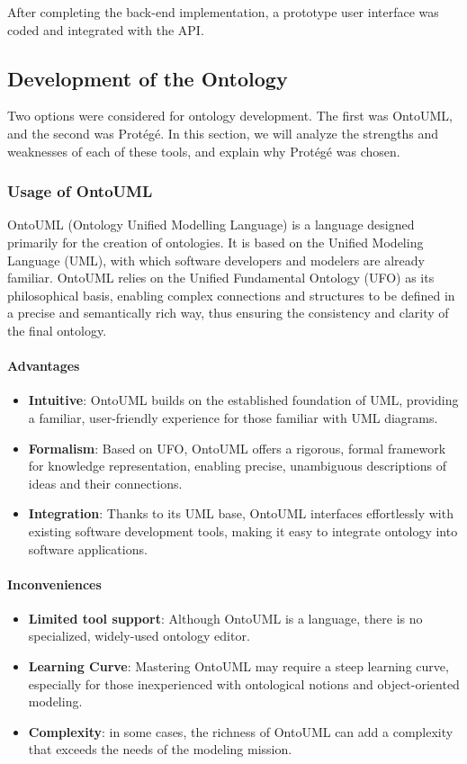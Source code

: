 After completing the back-end implementation, a prototype user interface was coded and integrated with the API.


\subsection{Development of the Ontology \label{subsec:ontologyDev}}
Two options were considered for ontology development. The first was OntoUML, and the second was Protégé. In this section, we will analyze the strengths and weaknesses of each of these tools, and explain why Protégé was chosen.

    \subsubsection{Usage of OntoUML}
    OntoUML (Ontology Unified Modelling Language) is a language designed primarily for the creation of ontologies. It is based on the Unified Modeling Language (UML), with which software developers and modelers are already familiar. OntoUML relies on the Unified Fundamental Ontology (UFO) as its philosophical basis, enabling complex connections and structures to be defined in a precise and semantically rich way, thus ensuring the consistency and clarity of the final ontology.
    
    \paragraph{Advantages}
        \begin{itemize}
            \item \textbf{Intuitive}: OntoUML builds on the established foundation of UML, providing a familiar, user-friendly experience for those familiar with UML diagrams.
            \item \textbf{Formalism}: Based on UFO, OntoUML offers a rigorous, formal framework for knowledge representation, enabling precise, unambiguous descriptions of ideas and their connections.
            \item \textbf{Integration}: Thanks to its UML base, OntoUML interfaces effortlessly with existing software development tools, making it easy to integrate ontology into software applications.
        \end{itemize}
        
    \paragraph{Inconveniences}
        \begin{itemize}
            \item \textbf{Limited tool support}: Although OntoUML is a language, there is no specialized, widely-used ontology editor.
            \item \textbf{Learning Curve}: Mastering OntoUML may require a steep learning curve, especially for those inexperienced with ontological notions and object-oriented modeling.
            \item \textbf{Complexity}: in some cases, the richness of OntoUML can add a complexity that exceeds the needs of the modeling mission.
        \end{itemize}
    
